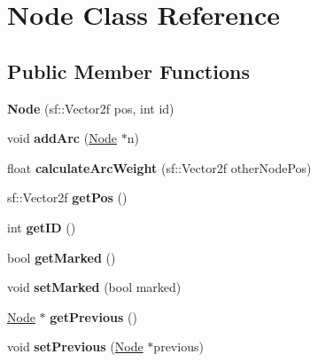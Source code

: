 \hypertarget{class_node}{}\section{Node Class Reference}
\label{class_node}
\subsection*{Public Member Functions}
\begin{DoxyCompactItemize}
\item 
\mbox{\label{class_node_a895a106b9d0954d8c12b63ce602bc023}} 
{\bfseries Node} (sf\+::\+Vector2f pos, int id)
\item 
\mbox{\label{class_node_a54fc4e9571a82fa8518994f44b067f31}} 
void {\bfseries add\+Arc} (\mbox{\hyperlink{class_node}{Node}} $\ast$n)
\item 
\mbox{\label{class_node_a5f6014a8a8d873312eaf12303305a939}} 
float {\bfseries calculate\+Arc\+Weight} (sf\+::\+Vector2f other\+Node\+Pos)
\item 
\mbox{\label{class_node_ae9a4a95cb9db8edaab906e655f565757}} 
sf\+::\+Vector2f {\bfseries get\+Pos} ()
\item 
\mbox{\label{class_node_a8dd9a1d6ac9638fd1168283ad47e5127}} 
int {\bfseries get\+ID} ()
\item 
\mbox{\label{class_node_a68db6b1bbbf8d5e3d67b13fc1940ab7f}} 
bool {\bfseries get\+Marked} ()
\item 
\mbox{\label{class_node_acae0df9df948547644b89814f1ba1c2f}} 
void {\bfseries set\+Marked} (bool marked)
\item 
\mbox{\label{class_node_a0a81fcd9f6bd8cf43f8ccab295411283}} 
\mbox{\hyperlink{class_node}{Node}} $\ast$ {\bfseries get\+Previous} ()
\item 
\mbox{\label{class_node_af8c0c4e1ecf2f6a49dd899e2a57c14fb}} 
void {\bfseries set\+Previous} (\mbox{\hyperlink{class_node}{Node}} $\ast$previous)
\item 
\mbox{\label{class_node_a3e121b2968b4a04dc7a8c50fbad63045}} 

\end{DoxyCompactItemize}
